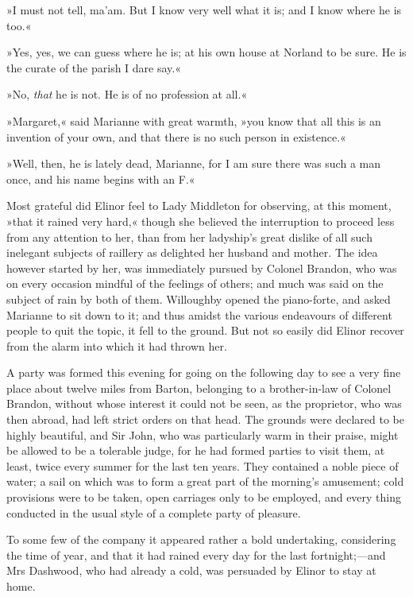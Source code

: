 »I must not tell, ma’am. But I know very well what it is; and I know where he is too.«

»Yes, yes, we can guess where he is; at his own house at Norland to be sure. He is the curate of the parish I dare say.«

»No, \textit{that} he is not. He is of no profession at all.«

»Margaret,« said Marianne with great warmth, »you know that all this is an invention of your own, and that there is no such person in existence.«

»Well, then, he is lately dead, Marianne, for I am sure there was such a man once, and his name begins with an F.«

Most grateful did Elinor feel to Lady Middleton for observing, at this moment, »that it rained very hard,« though she believed the interruption to proceed less from any attention to her, than from her ladyship’s great dislike of all such inelegant subjects of raillery as delighted her husband and mother. The idea however started by her, was immediately pursued by Colonel Brandon, who was on every occasion mindful of the feelings of others; and much was said on the subject of rain by both of them. Willoughby opened the piano-forte, and asked Marianne to sit down to it; and thus amidst the various endeavours of different people to quit the topic, it fell to the ground. But not so easily did Elinor recover from the alarm into which it had thrown her.

A party was formed this evening for going on the following day to see a very fine place about twelve miles from Barton, belonging to a brother-in-law of Colonel Brandon, without whose interest it could not be seen, as the proprietor, who was then abroad, had left strict orders on that head. The grounds were declared to be highly beautiful, and Sir John, who was particularly warm in their praise, might be allowed to be a tolerable judge, for he had formed parties to visit them, at least, twice every summer for the last ten years. They contained a noble piece of water; a sail on which was to form a great part of the morning’s amusement; cold provisions were to be taken, open carriages only to be employed, and every thing conducted in the usual style of a complete party of pleasure.

To some few of the company it appeared rather a bold undertaking, considering the time of year, and that it had rained every day for the last fortnight;—and Mrs Dashwood, who had already a cold, was persuaded by Elinor to stay at home.

\makeatletter
{}
{%
	\enlargethispage{\baselineskip}
}{%

}
\makeatother
